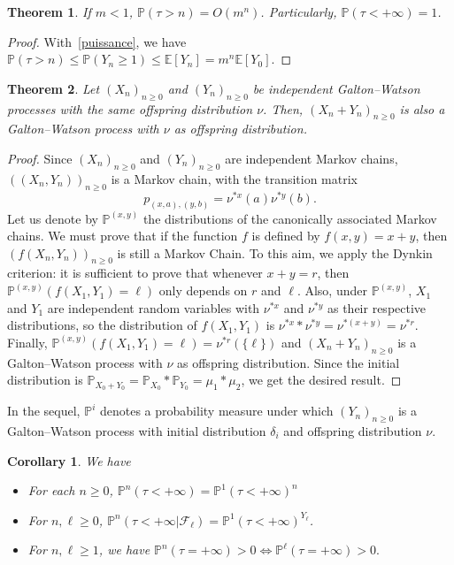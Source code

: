 \documentclass[svgnames]{amsart}
\newcommand{\E}{\ensuremath{\mathbb{E}}}
\renewcommand{\P}{\ensuremath{\mathbb{P}}}
\newcommand{\1}{\mathbbo{1}}
\newtheorem{theo}{Theorem}
\newtheorem{coro}{Corollary}
\begin{document}
\begin{theo}
\label{mort}
If $m<1$, $\P(\tau>n)=O(m^n)$. Particularly, $\P(\tau<+\infty)=1$.
\end{theo}
\begin{proof}
With~\eqref{puissance}, we have $\P(\tau>n)\le\P(Y_n\ge 1)\le \E[Y_n]=m^n\E[Y_0]$.
\end{proof}


\begin{theo}
\label{galtonindep}
Let $(X_n)_{n\ge 0}$ and  $(Y_n)_{n\ge 0}$ be independent  Galton--Watson processes with the same offspring distribution  $\nu$. Then, 
 $(X_n+Y_n)_{n\ge 0}$ is also a  Galton--Watson process with $\nu$ as offspring distribution.
\end{theo}
\begin{proof}
Since $(X_n)_{n\ge 0}$ and  $(Y_n)_{n\ge 0}$ are independent Markov chains, $((X_n,Y_n))_{n\ge 0}$ is a Markov chain, with the transition matrix
$$p_{(x,a),(y,b)}=\nu^{* x}(a)\nu^{* y}(b).$$ Let us denote by 
$\P^{(x,y)}$ the distributions of the canonically associated Markov chains.
We must prove that if the function $f$ is defined by  $f(x,y)=x+y$, then $(f(X_n,Y_n))_{n\ge 0}$ is still a Markov Chain. To this aim, we apply the Dynkin criterion: it is sufficient to prove that whenever $x+y=r$, then
$\P^{(x,y)}(f(X_1,Y_1)=\ell)$ only depends on $r$ and $\ell$.
Also, under  $\P^{(x,y)}$, $X_1$ and $Y_1$ are independent random variables with  $\nu^{* x}$ and $\nu^{* y}$ as their respective distributions, so the distribution of
 $f(X_1,Y_1)$ is  $\nu^{* x}* \nu^{* y}=\nu^{* (x+y)}=\nu^{* r}$.
Finally, $\P^{(x,y)}(f(X_1,Y_1)=\ell)=\nu^{* r}(\{\ell\})$ and 
$(X_n+Y_n)_{n\ge 0}$ is a Galton--Watson process with $\nu$ as offspring distribution. Since the initial distribution is $\P_{X_0+Y_0}=\P_{X_0}*\P_{Y_0}=\mu_1*\mu_2$, we get the desired result.
\end{proof}


In the sequel, $\P^i$ denotes a probability measure under which
$(Y_n)_{n\ge 0}$ is a Galton--Watson process with initial distribution $\delta_{i}$ and offspring distribution $\nu$.


\begin{coro}
We have
\begin{itemize}
\item For each $n\ge 0$, $\P^n(\tau<+\infty)=\P^{1}(\tau<+\infty)^n$
\item For $n,\ell\ge 0$, $\P^n(\tau<+\infty|\mathcal{F}_{\ell})=\P^{1}(\tau<+\infty)^{Y_{\ell}}$.
\item For $n,\ell\ge 1$, we have $\P^n(\tau=+\infty)>0 \iff \P^{\ell}(\tau=+\infty)>0.$
\end{itemize}
\end{coro}
\end{document}
